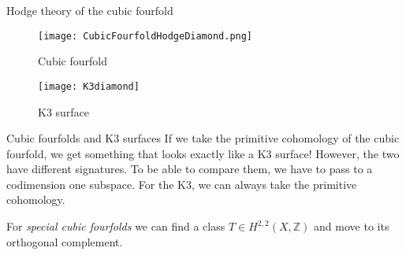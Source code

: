 \documentclass[10pt]{beamer}
\begin{document}
\begin{frame}[fragile]{Hodge theory of the cubic fourfold}
\begin{figure}
    \centering
    \begin{minipage}{0.45\textwidth}
        \centering
        \texttt{[image: CubicFourfoldHodgeDiamond.png]} %
        \caption*{Cubic fourfold}
    \end{minipage}\hfill
    \begin{minipage}{0.45\textwidth}
        \centering
        \texttt{[image: K3diamond]} %
        \caption*{K3 surface}
    \end{minipage}
\end{figure}

\end{frame}

\begin{comment}
    \begin{frame}{The moduli space of cubic fourfolds}
    Both K3 surfaces and cubic threefolds have a Global Torelli theorem, meaning that a cubic fourfold is specified by the line $H^{3,1}\subset H^4$, the condition $H^{3,1}\perp h^2$ and furthermore $\eta\cup \eta =0, \eta \cup \overline{\eta}>0$ and so the period map lands in an open subset of a quadric in $\P^{21}$. Voisin proved that this is an open immersion.
\end{frame}
\end{comment}

\begin{frame}{Cubic fourfolds and K3 surfaces}
    If we take the primitive cohomology of the cubic fourfold, we get something that looks exactly like a K3 surface! However, the two have different signatures.
    To be able to compare them, we have to pass to a codimension one subspace. For the K3, we can always take the primitive cohomology. 
    
    \pause For \emph{special cubic fourfolds} we can find a class $T\in H^{2,2}(X,\mathbb{Z})$ and move to its orthogonal complement.
\end{frame}
\end{document}
